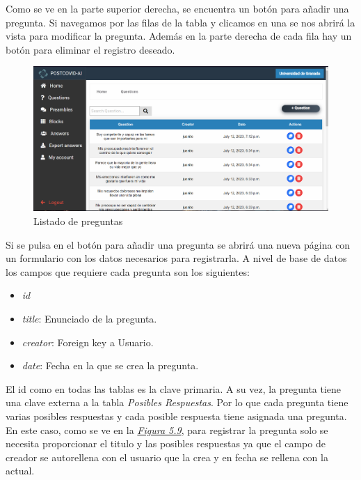 Como se ve en la parte superior derecha, se encuentra un botón para añadir una pregunta. Si navegamos por las filas de la tabla y clicamos en una se nos abrirá la vista para modificar la pregunta. Además en la parte derecha de cada fila hay un botón para eliminar el registro deseado.

\begin{figure}[!ht]
    \centering
    \includegraphics[width=1\textwidth]{imagenes/list_preguntas.png}
    \caption{ Listado de preguntas }
    \label{fig:vista-preguntas}
\end{figure}\vspace{0.5cm}

Si se pulsa en el botón para añadir una pregunta se abrirá una nueva página con un formulario con los datos necesarios para registrarla. A nivel de base de datos los campos que requiere cada pregunta son los siguientes:\vspace{0.3cm}

\begin{itemize}
    \item \textit{id}
    \item  \textit{title}: Enunciado de la pregunta.
    \item \textit{creator}: Foreign key a Usuario.
    \item \textit{date}: Fecha en la que se crea la pregunta. 
\end{itemize}\vspace{0.3cm}

El id como en todas las tablas es la clave primaria. A su vez, la pregunta tiene una clave externa a la tabla \textit{Posibles Respuestas}. Por lo que cada pregunta tiene varias posibles respuestas y cada posible respuesta tiene asignada una pregunta. En este caso, como se ve en la \textit{\hyperref[fig:add-question]{Figura 5.9}}, para registrar la pregunta solo se necesita proporcionar el titulo y las posibles respuestas ya que el campo de creador se autorellena con el usuario que la crea y en fecha se rellena con la actual.

